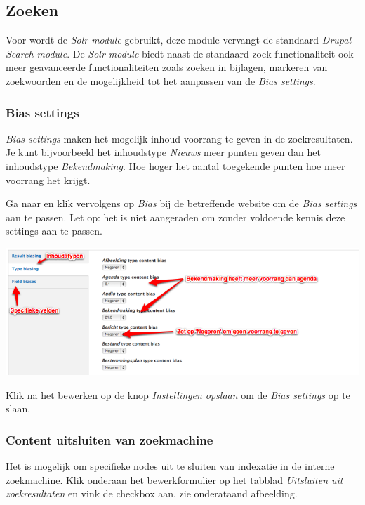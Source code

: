 
\subsection{Zoeken}\label{zoeken}

Voor \drupalpath wordt de \emph{Solr module} gebruikt, deze module vervangt de standaard \emph{Drupal Search module}. 
De \emph{Solr module} biedt naast de standaard zoek functionaliteit ook meer geavanceerde functionaliteiten zoals zoeken in bijlagen, markeren van zoekwoorden en de mogelijkheid tot het aanpassen van de \emph{Bias settings}. 

\subsubsection{Bias settings}

\emph{Bias settings} maken het mogelijk inhoud voorrang te geven in de zoekresultaten. Je kunt bijvoorbeeld het inhoudstype \emph{Nieuws} meer punten geven dan het inhoudstype \emph{Bekendmaking}. Hoe hoger het aantal toegekende punten hoe meer voorrang het krijgt. 

Ga naar  en klik vervolgens op \emph{Bias} bij de betreffende website om de \emph{Bias settings} aan te passen. Let op: het is niet aangeraden om zonder voldoende kennis deze settings aan te passen.

\begin{center}
	\includegraphics[width=\textwidth]{img/bias.png}
\end{center}

Klik na het bewerken op de knop \emph{Instellingen opslaan} om de \emph{Bias settings} op te slaan. 

\subsubsection{Content uitsluiten van zoekmachine}

Het is mogelijk om specifieke nodes uit te sluiten van indexatie in de interne zoekmachine. Klik onderaan het bewerkformulier op het tabblad \emph{Uitsluiten uit zoekresultaten} en vink de checkbox aan, zie onderataand afbeelding.

